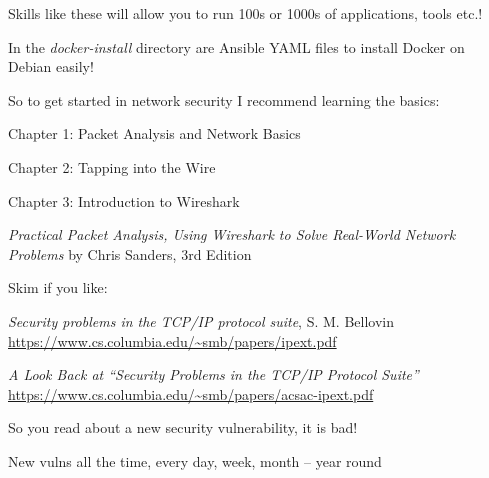 \documentclass[Screen16to9,17pt]{foils}
\begin{document}
\begin{list2}
\item Skills like these will allow you to run 100s or 1000s of applications, tools etc.!
\item In the \emph{docker-install} directory are Ansible YAML files to install Docker on Debian easily!
\end{list2}


So to get started in network security I recommend learning the basics:
\begin{list2}
\item Chapter 1: Packet Analysis and Network Basics
\item Chapter 2: Tapping into the Wire
\item Chapter 3: Introduction to Wireshark
\end{list2}
\emph{Practical Packet Analysis,
Using Wireshark to Solve Real-World Network Problems}
by Chris Sanders, 3rd Edition

Skim if you like:
\begin{list2}
\item
\emph{Security problems in the TCP/IP protocol suite}, S. M. Bellovin \url{https://www.cs.columbia.edu/~smb/papers/ipext.pdf}
\item \emph{A Look Back at “Security Problems in the TCP/IP Protocol Suite”} \url{https://www.cs.columbia.edu/~smb/papers/acsac-ipext.pdf}
\end{list2}


So you read about a new security vulnerability, it is bad!
\begin{list2}
\item New vulns all the time, every day, week, month -- year round
\end{list2}


\end{document}
